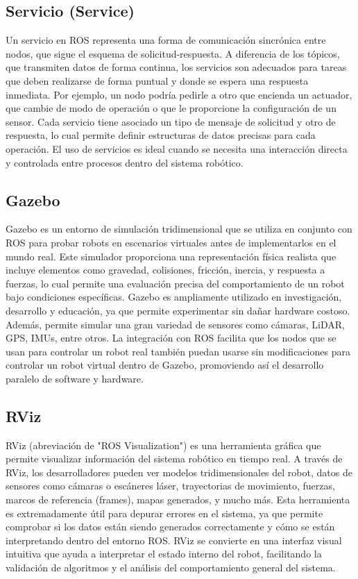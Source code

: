 \subsection{Servicio (Service)}
Un servicio en ROS representa una forma de comunicación sincrónica entre nodos, que sigue el esquema de solicitud-respuesta. A diferencia de los tópicos, que transmiten datos de forma continua, los servicios son adecuados para tareas que deben realizarse de forma puntual y donde se espera una respuesta inmediata. Por ejemplo, un nodo podría pedirle a otro que encienda un actuador, que cambie de modo de operación o que le proporcione la configuración de un sensor. Cada servicio tiene asociado un tipo de mensaje de solicitud y otro de respuesta, lo cual permite definir estructuras de datos precisas para cada operación. El uso de servicios es ideal cuando se necesita una interacción directa y controlada entre procesos dentro del sistema robótico.


\subsection{Gazebo}
Gazebo es un entorno de simulación tridimensional que se utiliza en conjunto con ROS para probar robots en escenarios virtuales antes de implementarlos en el mundo real. Este simulador proporciona una representación física realista que incluye elementos como gravedad, colisiones, fricción, inercia, y respuesta a fuerzas, lo cual permite una evaluación precisa del comportamiento de un robot bajo condiciones específicas. Gazebo es ampliamente utilizado en investigación, desarrollo y educación, ya que permite experimentar sin dañar hardware costoso. Además, permite simular una gran variedad de sensores como cámaras, LiDAR, GPS, IMUs, entre otros. La integración con ROS facilita que los nodos que se usan para controlar un robot real también puedan usarse sin modificaciones para controlar un robot virtual dentro de Gazebo, promoviendo así el desarrollo paralelo de software y hardware.

\subsection{RViz}
RViz (abreviación de "ROS Visualization") es una herramienta gráfica que permite visualizar información del sistema robótico en tiempo real. A través de RViz, los desarrolladores pueden ver modelos tridimensionales del robot, datos de sensores como cámaras o escáneres láser, trayectorias de movimiento, fuerzas, marcos de referencia (frames), mapas generados, y mucho más. Esta herramienta es extremadamente útil para depurar errores en el sistema, ya que permite comprobar si los datos están siendo generados correctamente y cómo se están interpretando dentro del entorno ROS. RViz se convierte en una interfaz visual intuitiva que ayuda a interpretar el estado interno del robot, facilitando la validación de algoritmos y el análisis del comportamiento general del sistema.
